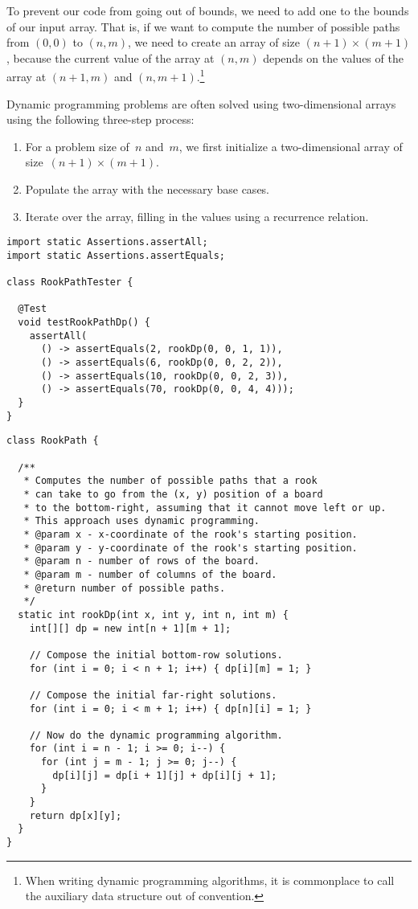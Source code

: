 To prevent our code from going out of bounds, we need to add one to the bounds of our input array. 
That is, if we want to compute the number of possible paths from $(0, 0)$ to $(n, m)$, we need to create an array of size $(n + 1) \times (m + 1)$, because the current value of the array at $(n, m)$ depends on the values of the array at $(n + 1, m)$ and $(n, m + 1)$.\footnote{When writing dynamic programming algorithms, it is commonplace to call the auxiliary data structure  out of convention.} 

Dynamic programming problems are often solved using two-dimensional arrays using the following three-step process: 

\begin{enumerate}
  \item For a problem size of~$n$ and~$m$, we first initialize a two-dimensional array of size~$(n + 1) \times (m + 1)$.
  \item Populate the array with the necessary base cases.
  \item Iterate over the array, filling in the values using a recurrence relation.
\end{enumerate}

\begin{lstlisting}[language=MyJava]
import static Assertions.assertAll;
import static Assertions.assertEquals;

class RookPathTester {

  @Test
  void testRookPathDp() {
    assertAll(
      () -> assertEquals(2, rookDp(0, 0, 1, 1)),
      () -> assertEquals(6, rookDp(0, 0, 2, 2)),
      () -> assertEquals(10, rookDp(0, 0, 2, 3)),
      () -> assertEquals(70, rookDp(0, 0, 4, 4)));
  }
}
\end{lstlisting}

\begin{lstlisting}[language=MyJava]
class RookPath {

  /**
   * Computes the number of possible paths that a rook 
   * can take to go from the (x, y) position of a board 
   * to the bottom-right, assuming that it cannot move left or up. 
   * This approach uses dynamic programming.
   * @param x - x-coordinate of the rook's starting position.
   * @param y - y-coordinate of the rook's starting position.
   * @param n - number of rows of the board.
   * @param m - number of columns of the board.
   * @return number of possible paths.
   */
  static int rookDp(int x, int y, int n, int m) {
    int[][] dp = new int[n + 1][m + 1];

    // Compose the initial bottom-row solutions.
    for (int i = 0; i < n + 1; i++) { dp[i][m] = 1; }

    // Compose the initial far-right solutions.
    for (int i = 0; i < m + 1; i++) { dp[n][i] = 1; }

    // Now do the dynamic programming algorithm.
    for (int i = n - 1; i >= 0; i--) {
      for (int j = m - 1; j >= 0; j--) {
        dp[i][j] = dp[i + 1][j] + dp[i][j + 1];
      }
    }
    return dp[x][y];
  }
}
\end{lstlisting}

